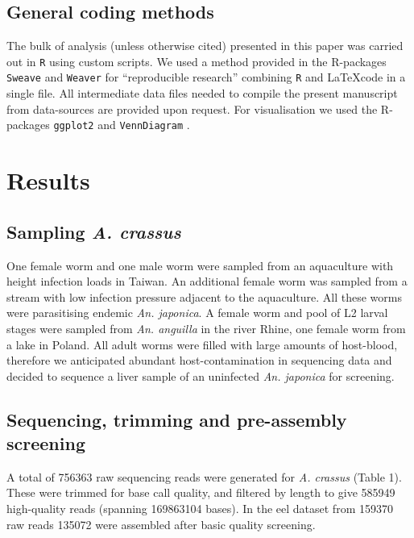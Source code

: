 \documentclass[10pt]{bmc_article}
\newenvironment{bmcformat}{\begin{raggedright}\baselineskip20pt\sloppy\setboolean{publ}{false}}{\end{raggedright}\baselineskip20pt\sloppy}
\begin{document}
\begin{bmcformat}
\subsection*{General coding methods}

The bulk of analysis (unless otherwise cited) presented in this paper
was carried out in \texttt{R} \cite{R_project} using custom
scripts. We used a method provided in the R-packages \texttt{Sweave}
\cite{lmucs-papers:Leisch:2002} and \texttt{Weaver} \cite{weaver} for
``reproducible research'' combining \texttt{R} and \LaTeX code in a
single file. All intermediate data files needed to compile the present
manuscript from data-sources are provided upon request. For
visualisation we used the R-packages \texttt{ggplot2}
\cite{ggplot-book} and \texttt{VennDiagram} \cite{pmid21269502}.


\section*{Results}


\subsection*{Sampling \textit{A. crassus}}

One female worm and one male worm were sampled from an aquaculture
with height infection loads in Taiwan. An additional female worm was
sampled from a stream with low infection pressure adjacent to the
aquaculture. All these worms were parasitising endemic
\textit{An. japonica}. A female worm and pool of L2 larval stages were
sampled from \textit{An. anguilla} in the river Rhine, one female worm
from a lake in Poland. All adult worms were filled with large amounts
of host-blood, therefore we anticipated abundant host-contamination in
sequencing data and decided to sequence a liver sample of an uninfected
\textit{An. japonica} for screening.

 \subsection*{Sequencing, trimming and pre-assembly screening}



 A total of 756363 raw sequencing reads were generated for
 \textit{A. crassus} (Table 1). These were trimmed for base call
 quality, and filtered by length to give 585949 high-quality reads
 (spanning 169863104 bases). In the eel dataset from 159370 raw reads
 135072 were assembled after basic quality screening.


\end{bmcformat}
\end{document}
